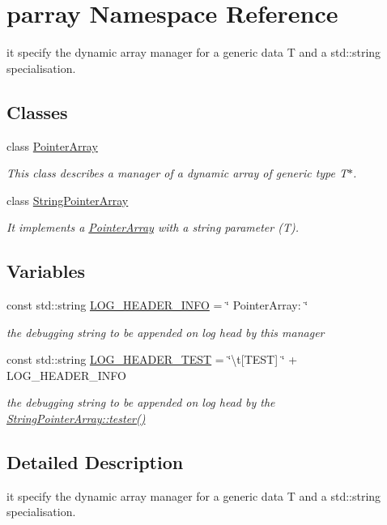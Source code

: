 \hypertarget{namespaceparray}{\section{parray Namespace Reference}
\label{namespaceparray}
}


it specify the dynamic array manager for a generic data T and a std\-::string specialisation.  


\subsection*{Classes}
\begin{DoxyCompactItemize}
\item 
class \hyperlink{classparray_1_1PointerArray}{Pointer\-Array}
\begin{DoxyCompactList}\small\item\em This class describes a manager of a dynamic array of generic type T$\ast$. \end{DoxyCompactList}\item 
class \hyperlink{classparray_1_1StringPointerArray}{String\-Pointer\-Array}
\begin{DoxyCompactList}\small\item\em It implements a \hyperlink{classparray_1_1PointerArray_ab506b284822d1e013813579e06893797}{Pointer\-Array} with a string parameter (T). \end{DoxyCompactList}\end{DoxyCompactItemize}
\subsection*{Variables}
\begin{DoxyCompactItemize}
\item 
\hypertarget{namespaceparray_ae12e5e44ecdf5808872ebdc05476e93f}{const std\-::string \hyperlink{namespaceparray_ae12e5e44ecdf5808872ebdc05476e93f}{L\-O\-G\-\_\-\-H\-E\-A\-D\-E\-R\-\_\-\-I\-N\-F\-O} = \char`\"{} Pointer\-Array\-: \char`\"{}}\label{namespaceparray_ae12e5e44ecdf5808872ebdc05476e93f}

\begin{DoxyCompactList}\small\item\em the debugging string to be appended on log head by this manager \end{DoxyCompactList}\item 
\hypertarget{namespaceparray_ab57bc1fd35280f9304abbf9755598710}{const std\-::string \hyperlink{namespaceparray_ab57bc1fd35280f9304abbf9755598710}{L\-O\-G\-\_\-\-H\-E\-A\-D\-E\-R\-\_\-\-T\-E\-S\-T} = \char`\"{}\textbackslash{}t\mbox{[}T\-E\-S\-T\mbox{]} \char`\"{} + L\-O\-G\-\_\-\-H\-E\-A\-D\-E\-R\-\_\-\-I\-N\-F\-O}\label{namespaceparray_ab57bc1fd35280f9304abbf9755598710}

\begin{DoxyCompactList}\small\item\em the debugging string to be appended on log head by the \hyperlink{classparray_1_1StringPointerArray_abfac13570bec8c88311714d19ddea59b}{String\-Pointer\-Array\-::tester()} \end{DoxyCompactList}\end{DoxyCompactItemize}


\subsection{Detailed Description}
it specify the dynamic array manager for a generic data T and a std\-::string specialisation. 